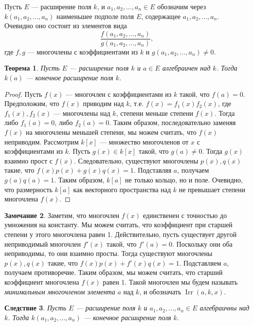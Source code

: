 \documentclass[12pt, titlepage, oneside]{amsbook}
\newcommand{\Irr}{\operatorname{Irr}}
\newtheorem{theorem}{Теорема}[chapter]
\newtheorem{corollary}[theorem]{Следствие}
\theoremstyle{definition}
\newtheorem{remark}[theorem]{Замечание}
\theoremstyle{remark}
\begin{document}
Пусть $E$ --- расширение поля $k$, и $a_1,a_2,\ldots, a_n\in E$ обозначим через $k(a_1,a_2,\ldots, a_n)$ наименьшее подполе поля $E$, содержащее $a_1,a_2,\ldots,a_n$. Очевидно оно состоит из элементов вида $$\frac{f(a_1,a_2,\ldots,a_n)}{g(a_1,a_2,\ldots,a_n)},$$ где $f,g$ --- многочлены с коэффициентами из $k$ и $g(a_1,a_2,\ldots,a_n)\neq 0$.

\begin{theorem}
\label{Ras3} Пусть $E$ --- расширение поля $k$ и $a\in E$ алгебраичен над $k$. Тогда $k(a)$ --- конечное расширение поля $k$.
\end{theorem}

\begin{proof}
Пусть $f(x)$ --- многочлен с коэффициентами из $k$ такой, что $f(a)=0$. Предположим, что $f(x)$ приводим над $k$, т.е. $f(x)=f_1(x)f_2(x)$, где $f_1(x),f_2(x)$ --- многочлены над $k$, степени меньше степени $f(x)$. Тогда либо $f_1(a)=0$, либо $f_2(a)=0$. Таким образом, последовательно заменяя $f(x)$ на многочлены меньшей степени, мы можем считать, что $f(x)$ неприводим. Рассмотрим $k[x]$ --- множество многочленов от $x$ с коэффициентами из $k$. Пусть $g(x)\in k[x]$ такой, что $g(a)\neq 0$. Тогда $g(x)$ взаимно прост с $f(x)$. Следовательно, существуют многочлены $p(x), q(x)$ такие, что $f(x)p(x)+g(x)q(x)=1$. Подставляя $a$, получаем $g(a)q(a)=1$. Таким образом, $k[a]$ не только кольцо, но и поле. Очевидно, что размерность $k[a]$ как векторного пространства над $k$ не превышает степени многочлена $f(x)$.
\end{proof}

\begin{remark}
Заметим, что многочлен $f(x)$ единственен с точностью до умножения на константу. Мы можем считать, что коэффициент при старшей степени у этого многочлена равен 1. Действительно, пусть существует другой неприводимый многочлен $f'(x)$ такой, что $f'(a)=0$. Поскольку они оба неприводимы, то они взаимно просты. Тогда существуют многочлены $p(x), q(x)$ такие, что $f(x)p(x)+f'(x)q(x)=1$. Подставляем $a$, получаем противоречие. Таким образом, мы можем считать, что старший коэффициент многочлена $f(x)$ равен 1. Такой многочлен мы будем называть \emph{минимальным многочленом элемента} $a$ над $k$, и обозначать $\Irr(a,k,x)$.
\end{remark}

\begin{corollary}
\label{Ras4}
Пусть $E$ --- расширение поля $k$ и $a_1,a_2,\ldots,a_n\in E$ алгебраичны над $k$. Тогда $k(a_1,a_2,\ldots,a_n)$ --- конечное расширение поля $k$.
\end{corollary}
\end{document}
